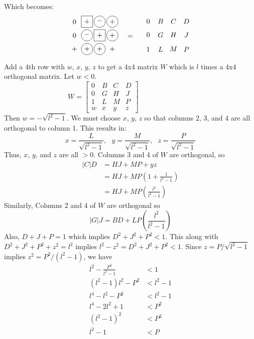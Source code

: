 Which becomes:
\begin{equation*}
\myarrset
\begin{array}{cccc}
\ndcz & \dsp  & \dcm  & \dcp  \\
\ndcz & \dcm  & \dsp  & \dcp  \\
\ndcp & \dcp  & \dcp  & \ndcp
\end{array}
~~~=~~~
\myarrset
\begin{array}{cccc}
\ndc{$0$} & \ndc{$B$} & \ndc{$C$} & \ndc{$D$} \\
\ndc{$0$} & \ndc{$G$} & \ndc{$H$} & \ndc{$J$} \\
\ndc{$1$} & \ndc{$L$} & \ndc{$M$} & \ndc{$P$}
\end{array}
\end{equation*}
Add a 4th row with $w$, $x$, $y$, $z$ to get a 4x4 matrix $W$ which is $l$
times a 4x4 orthogonal matrix.  Let $w < 0$.
\begin{equation*}
W = 
\begin{bmatrix}
0 & B & C & D \\
0 & G & H & J \\
1 & L & M & P \\
w & x & y & z
\end{bmatrix}
~~~~~~~~~~~~~~~~~~~~~~~~~~~~~~~~~~~
\end{equation*}
Then $w = -\sqrt{l^2-1}$.  We must choose $x$, $y$, $z$ so that columns 2, 3,
and 4 are all orthogonal to column 1.  This results in:
\begin{equation*}
x = \frac{L}{\sqrt{l^2-1}},~~~
y = \frac{M}{\sqrt{l^2-1}},~~~
z = \frac{P}{\sqrt{l^2-1}}
\end{equation*}
Thus, $x$, $y$, and $z$ are all $> 0$.  Columns 3 and 4 of $W$ are orthogonal,
so
\begin{align*}
|C|D &= HJ + MP + yz                          \\
     &= HJ + MP\left(1+\frac{1}{l^2-1}\right) \\
     &= HJ + MP\left(\frac{l^2}{l^2-1}\right)
\end{align*}
Similarly, Columns 2 and 4 of $W$ are orthogonal so
\begin{equation*}
|G|J = BD + LP\left(\frac{l^2}{l^2-1}\right)
\end{equation*}
Also, $D + J + P = 1$ which implies $D^2 + J^2 + P^2 < 1$.  This along with
$D^2 + J^2 + P^2 + z^2 = l^2$ implies $l^2 - z^2 = D^2 + J^2 + P^2 < 1$.
Since $z = P/\sqrt{l^2-1}$ implies $z^2 = P^2/(l^2-1)$, we have
\begin{align*}
l^2 - \frac{P^2}{l^2-1} &< 1     \\
       (l^2-1)l^2 - P^2 &< l^2-1 \\
            l^4-l^2-P^2 &< l^2-1 \\
             l^4-2l^2+1 &< P^2   \\
              (l^2-1)^2 &< P^2   \\
                  l^2-1 &< P
\end{align*}
